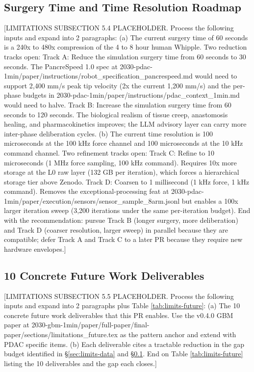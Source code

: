 \subsection{Surgery Time and Time Resolution Roadmap}
\label{sec:limits-resolution}

[LIMITATIONS SUBSECTION 5.4 PLACEHOLDER. Process the following inputs and expand into 2 paragraphs:
(a) The current surgery time of 60 seconds is a 240x to 480x compression of the 4 to 8 hour human Whipple. Two reduction tracks open:
    Track A: Reduce the simulation surgery time from 60 seconds to 30 seconds. The PancreSpeed 1.0 spec at 2030-pdac-1min/paper/instructions/robot_specification_pancrespeed.md would need to support 2,400 mm/s peak tip velocity (2x the current 1,200 mm/s) and the per-phase budgets in 2030-pdac-1min/paper/instructions/pdac_context_1min.md would need to halve.
    Track B: Increase the simulation surgery time from 60 seconds to 120 seconds. The biological realism of tissue creep, anastomosis healing, and pharmacokinetics improves; the LLM advisory layer can carry more inter-phase deliberation cycles.
(b) The current time resolution is 100 microseconds at the 100 kHz force channel and 100 microseconds at the 10 kHz command channel. Two refinement tracks open:
    Track C: Refine to 10 microseconds (1 MHz force sampling, 100 kHz command). Requires 10x more storage at the L0 raw layer (132 GB per iteration), which forces a hierarchical storage tier above Zenodo.
    Track D: Coarsen to 1 millisecond (1 kHz force, 1 kHz command). Removes the exceptional-processing feat at 2030-pdac-1min/paper/execution/sensors/sensor_sample_8arm.jsonl but enables a 100x larger iteration sweep (3,200 iterations under the same per-iteration budget).
End with the recommendation: pursue Track B (longer surgery, more deliberation) and Track D (coarser resolution, larger sweep) in parallel because they are compatible; defer Track A and Track C to a later PR because they require new hardware envelopes.]

\subsection{10 Concrete Future Work Deliverables}
\label{sec:limits-future}

[LIMITATIONS SUBSECTION 5.5 PLACEHOLDER. Process the following inputs and expand into 2 paragraphs plus Table \ref{tab:limits-future}:
(a) The 10 concrete future work deliverables that this PR enables. Use the v0.4.0 GBM paper at 2030-gbm-1min/paper/full-paper/final-paper/sections/limitations_future.tex as the pattern anchor and extend with PDAC specific items.
(b) Each deliverable cites a tractable reduction in the gap budget identified in \S \ref{sec:limits-data} and \S \ref{sec:limits-resolution}.
End on Table \ref{tab:limits-future} listing the 10 deliverables and the gap each closes.]

